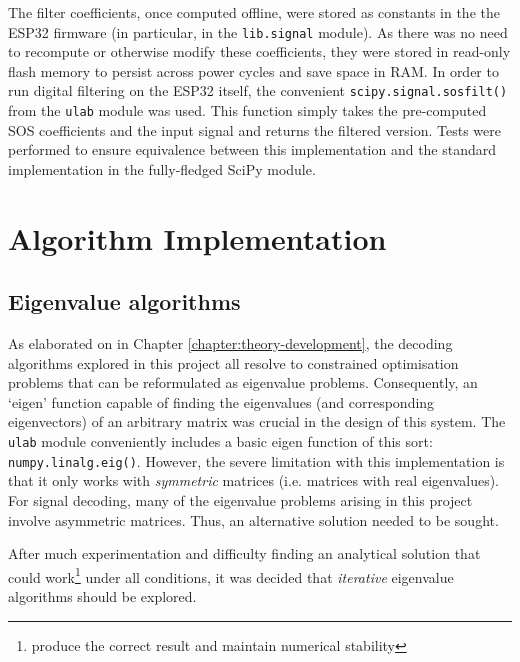 The filter coefficients, once computed offline, were stored as constants in the the ESP32 firmware (in particular, in the \texttt{lib.signal} module). As there was no need to recompute or otherwise modify these coefficients, they were stored in read-only flash memory to persist across power cycles and save space in RAM. In order to run digital filtering on the ESP32 itself, the convenient \texttt{scipy.signal.sosfilt()} from the \texttt{ulab} module was used. This function simply takes the pre-computed SOS coefficients and the input signal and returns the filtered version. Tests were performed to ensure equivalence between this implementation and the standard implementation in the fully-fledged SciPy module.  

\section{Algorithm Implementation}
\subsection{Eigenvalue algorithms}
As elaborated on in Chapter \ref{chapter:theory-development}, the decoding algorithms explored in this project all resolve to constrained optimisation problems that can be reformulated as eigenvalue problems. Consequently, an `eigen' function capable of finding the eigenvalues (and corresponding eigenvectors) of an arbitrary matrix was crucial in the design of this system. The \texttt{ulab} module conveniently includes a basic eigen function of this sort: \texttt{numpy.linalg.eig()}. However, the severe limitation with this implementation is that it only works with \textit{symmetric} matrices (i.e. matrices with real eigenvalues). For signal decoding, many of the eigenvalue problems arising in this project involve asymmetric matrices. Thus, an alternative solution needed to be sought. 

After much experimentation and difficulty finding an analytical solution that could work\footnote{produce the correct result and maintain numerical stability} under all conditions, it was decided that \textit{iterative} eigenvalue algorithms should be explored. 

